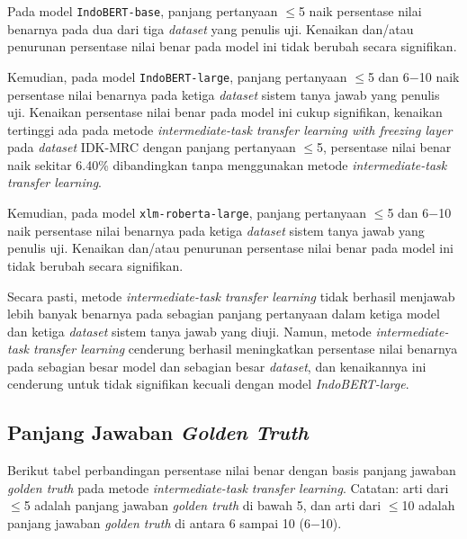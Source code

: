 Pada model \texttt{IndoBERT-base}, panjang pertanyaan $\leq$5 naik persentase nilai benarnya pada dua dari tiga \emph{dataset} yang penulis uji. Kenaikan dan/atau penurunan persentase nilai benar pada model ini tidak berubah secara signifikan.

Kemudian, pada model \texttt{IndoBERT-large}, panjang pertanyaan $\leq$5 dan 6$-$10 naik persentase nilai benarnya pada ketiga \emph{dataset} sistem tanya jawab yang penulis uji. Kenaikan persentase nilai benar pada model ini cukup signifikan, kenaikan tertinggi ada pada metode \emph{intermediate-task transfer learning with freezing layer} pada \emph{dataset} IDK-MRC dengan panjang pertanyaan $\leq$5, persentase nilai benar naik sekitar 6.40\% dibandingkan tanpa menggunakan metode \emph{intermediate-task transfer learning}.

Kemudian, pada model \texttt{xlm-roberta-large}, panjang pertanyaan $\leq$5 dan 6$-$10 naik persentase nilai benarnya pada ketiga \emph{dataset} sistem tanya jawab yang penulis uji. Kenaikan dan/atau penurunan persentase nilai benar pada model ini tidak berubah secara signifikan.

Secara pasti, metode \emph{intermediate-task transfer learning} tidak berhasil menjawab lebih banyak benarnya pada sebagian panjang pertanyaan dalam ketiga model dan ketiga \emph{dataset} sistem tanya jawab yang diuji. Namun, metode \emph{intermediate-task transfer learning} cenderung berhasil meningkatkan persentase nilai benarnya pada sebagian besar model dan sebagian besar \emph{dataset}, dan kenaikannya ini cenderung untuk tidak signifikan kecuali dengan model \emph{IndoBERT-large}.

\subsection{Panjang Jawaban \emph{Golden Truth}}
Berikut tabel perbandingan persentase nilai benar dengan basis panjang jawaban \emph{golden truth} pada metode \emph{intermediate-task transfer learning}. Catatan: arti dari $\leq$5 adalah panjang jawaban \emph{golden truth} di bawah 5, dan arti dari $\leq$10 adalah panjang jawaban \emph{golden truth} di antara 6 sampai 10 (6$-$10).

